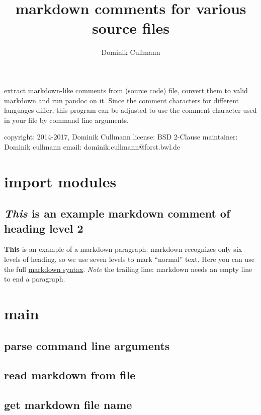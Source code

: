 \documentclass[]{article}
\title{markdown comments for various source files}
\author{Dominik Cullmann}
\date{}
\begin{document}
\maketitle

extract markdown-like comments from (source code) file, convert them to
valid markdown and run pandoc on it. Since the comment characters for
different languages differ, this program can be adjusted to use the
comment character used in your file by command line arguments.

copyright: 2014-2017, Dominik Cullmann license: BSD 2-Clause maintainer:
Dominik cullmann email: dominik.cullmann@forst.bwl.de

\section{import modules}\label{import-modules}

\subsection{\texorpdfstring{\emph{This} is an example markdown comment
of heading level
2}{This is an example markdown comment of heading level 2}}\label{this-is-an-example-markdown-comment-of-heading-level-2}

\textbf{This} is an example of a markdown paragraph: markdown recognizes
only six levels of heading, so we use seven levels to mark ``normal''
text. Here you can use the full
\href{http://daringfireball.net/projects/markdown/syntax}{markdown
syntax}. \emph{Note} the trailing line: markdown needs an empty line to
end a paragraph.

\section{main}\label{main}

\subsection{parse command line
arguments}\label{parse-command-line-arguments}

\subsection{read markdown from file}\label{read-markdown-from-file}

\subsection{get markdown file name}\label{get-markdown-file-name}
\end{document}
